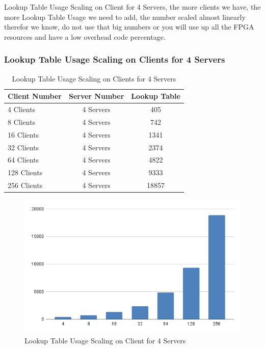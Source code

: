 Lookup Table Usage Scaling on Client for 4 Servers, the more clients we have, the more Lookup Table Usage we need to add, the number scaled almost linearly therefor we know, do not use that big numbers or you will use up all the FPGA resources and have a low overhead code percentage.

\subsubsection{Lookup Table Usage Scaling on Clients for 4 Servers}

\begin{table}[htb]
	\centering
	\caption{Lookup Table Usage Scaling on Clients for 4 Servers}
	\begin{tabular}{l c c}
		\toprule
    	Client Number  & Server Number  & Lookup Table\\ \midrule
        4	Clients	&	4	Servers	&	405	\\
        8	Clients	&	4	Servers	&	742	\\
        16	Clients	&	4	Servers	&	1341	\\
        32	Clients	&	4	Servers	&	2374	\\
        64	Clients	&	4	Servers	&	4822	\\
        128	Clients	&	4	Servers	&	9333	\\
        256	Clients	&	4	Servers	&	18857	\\
		\bottomrule
	\end{tabular}
	\label{tab:luts4}
\end{table}

 \begin{figure}[h]
	\centering
	\includegraphics[width=.9\linewidth]{figures/Scaling/LUT4.png}
	\caption{Lookup Table Usage Scaling on Client for 4 Servers}
	\label{fig:luts4}
\end{figure}
\newpage
